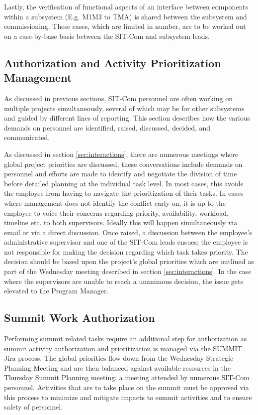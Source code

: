 \documentclass[SE,lsstdraft,authoryear,toc]{lsstdoc}
\begin{document}
Lastly, the verification of functional aspects of an interface between components within a subsystem (E.g. M1M3 to TMA) is shared between the subsystem and commissioning.
These cases, which are limited in number, are to be worked out on a case-by-base basis between the SIT-Com and subsystem leads.

\subsection{Authorization and Activity Prioritization Management}

As discussed in previous sections, SIT-Com personnel are often working on multiple projects simultaneously, several of which may be for other subsystems and guided by different lines of reporting.
This section describes how the various demands on personnel are identified, raised, discussed, decided, and communicated.

As discussed in section \ref{sec:interactions}, there are numerous meetings where global project priorities are discussed, these conversations include demands on personnel and efforts are made to identify and negotiate the division of time before detailed planning at the individual task level.
In most cases, this avoids the employee from having to navigate the prioritization of their tasks.
In cases where management does not identify the conflict early on, it is up to the employee to voice their concerns regarding priority, availability, workload, timeline etc. to both supervisors.
Ideally this will happen simultaneously via email or via a direct discussion.
Once raised, a discussion between the employee's administrative supervisor and one of the SIT-Com leads ensues; the employee is not responsible for making the decision regarding which task takes priority.
The decision should be based upon the project's global priorities which are outlined as part of the Wednesday meeting described in section \ref{sec:interactions}.
In the case where the supervisors are unable to reach a unanimous decision, the issue gets elevated to the Program Manager.

\subsection{Summit Work Authorization}
Performing summit related tasks require an additional step for authorization as summit activity authorization and prioritization is managed via the SUMMIT Jira process.
The global priorities flow down from the Wednesday Strategic Planning Meeting and are then balanced against available resources in the Thursday Summit Planning meeting; a meeting attended by numerous SIT-Com personnel.
Activities that are to take place on the summit must be approved via this process to minimize and mitigate impacts to summit activities and to ensure safety of personnel.
\end{document}
